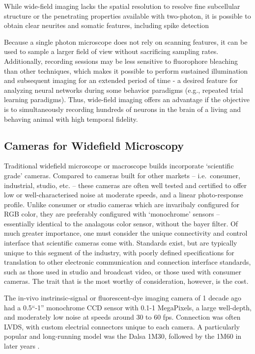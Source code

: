 While wide-field imaging lacks the spatial resolution to resolve fine subcellular structure or the penetrating properties available with two-photon, it is possible to obtain clear neurites and somatic features, including spike detection

Because a single photon microscope does not rely on scanning features, it can be used to sample a larger field of view without sacrificing sampling rates.
Additionally, recording sessions may be less sensitive to fluorophore bleaching than other techniques, which makes it possible to perform sustained illumination and subsequent imaging for an extended period of time - a desired feature for analyzing neural networks during some behavior paradigms (e.g., repeated trial learning paradigms).
Thus, wide-field imaging offers an advantage if the objective is to simultaneously recording hundreds of neurons in the brain of a living and behaving animal with high temporal fidelity.

\subsection{Cameras for Widefield Microscopy}\label{sec:cameras-for-widefield-microscopy}

Traditional widefield microscope or macroscope builds incorporate `scientific grade' cameras.
Compared to cameras built for other markets -- i.e.~consumer, industrial, studio, etc. -- these cameras are often well tested and certified to offer low or well-characterised noise at moderate speeds, and a linear photo-response profile.
Unlike consumer or studio cameras which are invaribaly configured for RGB color, they are preferably configured with `monochrome' sensors -- essentially identical to the analagous color sensor, without the bayer filter.
Of much greater importance, one must consider the unique connectivity and control interface that scientific cameras come with.
Standards exist, but are typically unique to this segment of the industry, with poorly defined specifications for translation to other electronic communication and connection interface standards, such as those used in studio and broadcast video, or those used with consumer cameras.
The trait that is the most worthy of consideration, however, is the cost.

The in-vivo instrinsic-signal or fluorescent-dye imaging camera of 1 decade ago had a 0.5``-1'' monochrome CCD sensor with 0.1-1 MegaPixels, a large well-depth, and moderately low noise at speeds around 30 to 60 fps.
Connection was often LVDS, with custom electrial connectors unique to each camera.
A particularly popular and long-running model was the Dalsa 1M30, followed by the 1M60 in later years \cite{Takahashi_2006}.

